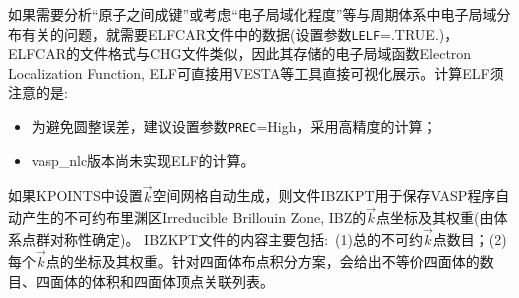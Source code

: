 如果需要分析``原子之间成键''或考虑``电子局域化程度''等与周期体系中电子局域分布有关的问题，就需要\textrm{ELFCAR}文件中的数据(设置参数\texttt{LELF}=\textrm{.TRUE.})，\textrm{ELFCAR}的文件格式与\textrm{CHG}文件类似，因此其存储的电子局域函数\textrm{Electron Localization Function, ELF}可直接用\textrm{VESTA}等工具直接可视化展示。计算\textrm{ELF}须注意的是:
\begin{itemize}
	\item 为避免圆整误差，建议设置参数\texttt{PREC}=\textrm{High}，采用高精度的计算；
	\item \textrm{vasp\_nlc}版本尚未实现\textrm{ELF}的计算。
\end{itemize}
%
%
%
%
%
%
%
%
%
%
%
%
如果\textrm{KPOINTS}中设置$\vec k$空间网格自动生成，则文件\textrm{IBZKPT}用于保存\textrm{VASP}程序自动产生的不可约布里渊区\textrm{Irreducible Brillouin Zone, IBZ}的$\vec k$点坐标及其权重(由体系点群对称性确定)。
{\fontsize{8.2pt}{6.2pt}\selectfont{
}}
\textrm{IBZKPT}文件的内容主要包括:~(1)总的不可约$\vec k$点数目；(2)每个$\vec k$点的坐标及其权重。针对四面体布点积分方案，会给出不等价四面体的数目、四面体的体积和四面体顶点关联列表。
%
%
%
%
%
%
%


